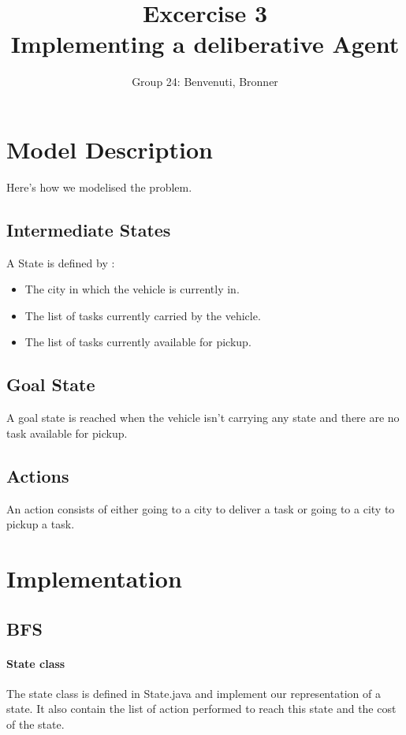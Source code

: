 \documentclass[11pt]{article}
\title{\bf Excercise 3\\ Implementing a deliberative Agent}
\author{Group 24: Benvenuti, Bronner}
\begin{document}
\maketitle

\section{Model Description}
Here's how we modelised the problem.
\subsection{Intermediate States}
A State is defined by :
\begin{itemize}
	\item The city in  which the vehicle is currently in.
	\item The list of tasks currently carried by the vehicle.
	\item The list of tasks currently available for pickup.
\end{itemize}

\subsection{Goal State}
A goal state is reached when the vehicle isn't carrying any state and there are no task available for pickup.

\subsection{Actions}
An action consists of either going to a city to deliver a task or going to a city to pickup a task.

\section{Implementation}

\subsection{BFS}
\paragraph{State class} The state class is defined in State.java and implement our representation of a state. It also contain the list of action performed to reach this state and the cost of the state.
\end{document}
